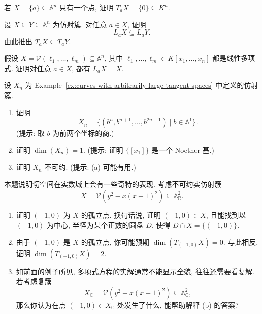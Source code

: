 \BookExerciseHeading
\begin{BookExercises}
  \item\label{ex:tangent-space-of-single-point} 若 $X=\{a\}\subseteq\mathbb{A}^{n}$ 只有一个点, 证明 $T_{a}X=\{0\}\subseteq K^{n}$.
  \item\label{ex:linearization-monotone-under-inclusion} 设 $X\subseteq Y\subseteq\mathbb{A}^{n}$ 为仿射簇. 对任意 $a\in X$, 证明
  \[
    L_{a}X\subseteq L_{a}Y.
  \]
  由此推出 $T_{a}X\subseteq T_{a}Y$.
  \item\label{ex:linear-variety-equals-its-linearization} 假设 $X=\mathcal{V}(\ell_{1},\ldots,\ell_{m})\subseteq\mathbb{A}^{n}$, 其中 $\ell_{1},\ldots,\ell_{m}\in K[x_{1},\ldots,x_{n}]$ 都是线性多项式. 证明对任意 $a\in X$, 都有 $L_{a}X=X$.
  \item\label{ex:monomial-affine-curve-parametrization-and-dimension} 设 $X_{n}$ 为 Example~\ref{ex:curves-with-arbitrarily-large-tangent-spaces} 中定义的仿射簇.
  \begin{enumerate}
    \item 证明
    \[
      X_{n}=\{(b^{n},b^{n+1},\ldots,b^{2n-1})\mid b\in\mathbb{A}^{1}\}.
    \]
    (提示: 取 $b$ 为前两个坐标的商.)
    \item 证明 $\dim(X_{n})=1$. (提示: 证明 $\{[x_{1}]\}$ 是一个 Noether 基.)
    \item 证明 $X_{n}$ 不可约. (提示: (a) 可能有用.)
  \end{enumerate}
  \item\label{ex:isolated-real-point-with-two-dimensional-tangent-space} 本题说明切空间在实数域上会有一些奇特的表现. 考虑不可约实仿射簇
  \[
    X=\mathcal{V}(y^{2}-x(x+1)^{2})\subseteq\mathbb{A}^{2}_{\mathbb{R}}.
  \]
  \begin{enumerate}
    \item 证明 $(-1,0)$ 为 $X$ 的孤立点. 换句话说, 证明 $(-1,0)\in X$, 且能找到以 $(-1,0)$ 为中心, 半径为某个正数的圆盘 $D$, 使得 $D\cap X=\{(-1,0)\}$.
    \item 由于 $(-1,0)$ 是 $X$ 的孤立点, 你可能预期 $\dim(T_{(-1,0)}X)=0$. 与此相反, 证明 $\dim(T_{(-1,0)}X)=2$.
    \item 如前面的例子所见, 多项式方程的实解通常不能显示全貌, 往往还需要看复解. 若考虑复簇
    \[
      X_{\mathbb{C}}=\mathcal{V}(y^{2}-x(x+1)^{2})\subseteq\mathbb{A}^{2}_{\mathbb{C}},
    \]
    那么你认为在点 $(-1,0)\in X_{\mathbb{C}}$ 处发生了什么, 能帮助解释 (b) 的答案?
  \end{enumerate}
\end{BookExercises}
